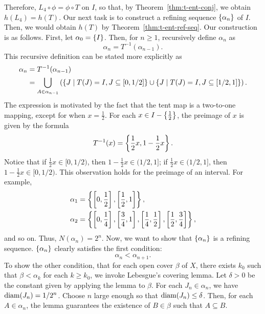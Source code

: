 \documentclass[12pt,twoside,draft]{book}
\begin{document}
Therefore, $L_4 \circ \phi = \phi \circ T$ on $I$, so that, by Theorem~\ref{thm:t-ent-conj}, we obtain $h(L_4) = h(T)$.
Our next task is to construct a refining sequence $\left \{ \alpha_n \right \}$ of $I$.
Then, we would obtain $h(T)$ by Theorem~\ref{thm:t-ent-ref-seq}.
Our construction is as follows.
First, let $\alpha_0 = \left \{ I \right \}$.
Then, for $n \geq 1$, recursively define $\alpha_n$ as
\begin{equation*}
  \alpha_n = T^{-1}(\alpha_{n-1}).
\end{equation*}
%
This recursive definition can be stated more explicitly as
\begin{align*}
  \alpha_n &= T^{-1}(\alpha_{n-1}) \\
  &= \bigcup\limits_{A \in \alpha_{n-1}} \left (  \left \{ J \mathrel{} \middle| \mathrel{} T(J) = I, J \subseteq [0,1/2] \right \} \cup \left \{ J \mathrel{} \middle| \mathrel{} T(J) = I, J \subseteq [1/2,1] \right \} \right ).
\end{align*}
The expression is motivated by the fact that the tent map is a two-to-one mapping, except for when $x = \frac{1}{2}$.
For each $x \in I - \left \{ \frac{1}{2} \right \}$, the preimage of $x$ is given by the formula
\begin{equation*}
  T^{-1}(x) = \left \{ \frac{1}{2} x, 1 - \frac{1}{2} x \right \}.
\end{equation*}
Notice that if $\frac{1}{2} x \in [0,1/2)$, then $1 - \frac{1}{2} x \in (1/2,1]$; if $\frac{1}{2} x \in (1/2,1]$, then $1 - \frac{1}{2} x \in [0,1/2)$.
This observation holds for the preimage of an interval.
For example,
\begin{align*}
  \alpha_1 &= \left \{ \left [ 0,\frac{1}{2} \right ], \left [ \frac{1}{2}, 1 \right ] \right \}, \\
  \alpha_2 &= \left \{ \left [ 0,\frac{1}{4} \right ], \left [ \frac{3}{4}, 1 \right ], \left [ \frac{1}{4}, \frac{1}{2} \right ], \left [ \frac{1}{2}, \frac{3}{4} \right ] \right \},
\end{align*}
and so on.
Thus, $N(\alpha_{n}) = 2^n$.
Now, we want to show that $\left \{ \alpha_n \right \}$ is a refining sequence.
$\left \{ \alpha_n \right \}$ clearly satisfies the first condition:
\begin{equation*}
  \alpha_n < \alpha_{n+1}.
\end{equation*}
To show the other condition, that for each open cover $\beta$ of $X$, there exists $k_0$ such that $\beta < \alpha_k$ for each $k \geq k_0$, we invoke Lebesgue's covering lemma.
Let $\delta > 0$ be the constant given by applying the lemma to $\beta$.
For each $J_n \in \alpha_n$, we have $\mathrm{diam}(J_n) = 1/{2^n}$.
Choose $n$ large enough so that $\mathrm{diam}(J_n) \leq \delta$.
Then, for each $A \in \alpha_n$, the lemma guarantees the existence of $B \in \beta$ such that $A \subseteq B$.
\end{document}
